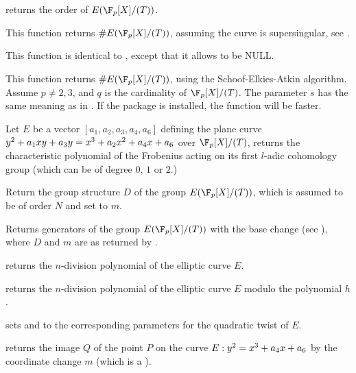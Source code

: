 returns the order of $E(\F_p[X]/(T))$.

This function returns $\#E(\F_p[X]/(T))$, assuming the curve is
supersingular, see .

This function is identical to
, except that it allows  to be {NULL}.

This function returns $\#E(\F_p[X]/(T))$, using the Schoof-Elkies-Atkin
algorithm.
Assume $p\neq 2,3$, and $q$ is the cardinality of $\F_p[X]/(T)$.
The parameter $s$ has the same meaning as in .
If the  package is installed, the function will be faster.

Let $E$ be a vector $[a_1,a_2,a_3,a_4,a_6]$ defining the plane curve
$y^2+a_1\*x\*y+a_3\*y = x^3+a_2\*x^2+a_4\*x+a_6$ over $\F_p[X]/(T)$,
returns the characteristic polynomial of the Frobenius acting on its
first $l$-adic cohomology group (which can be of degree $0$, $1$ or $2$.)

Return the group structure $D$ of the group $E(\F_p[X]/(T))$,
which is assumed to be of order $N$ and set  to $m$.

Returns generators of the group $E(\F_p[X]/(T))$ with the base change 
(see ), where $D$ and $m$ are as returned by
.

 returns the
$n$-division polynomial of the elliptic curve $E$.

returns the $n$-division polynomial of the elliptic curve $E$ modulo the
polynomial $h$.

sets  and  to the corresponding parameters for the
quadratic twist of $E$.


 returns the
image $Q$ of the point $P$ on the curve $E:y^2=x^3+a_4\*x+a_6$ by the
coordinate change $m$ (which is a ).

